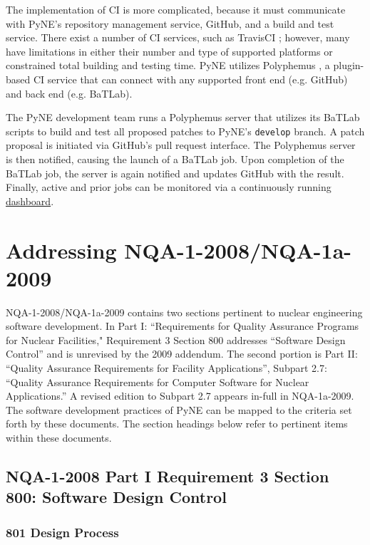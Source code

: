 \documentclass{anstrans}
\begin{document}
The implementation of CI is more complicated, because it
must communicate with PyNE's repository management service, GitHub, and a build
and test service. There exist a number of CI services, such as TravisCI
\cite{travis_2014}; however, many have limitations in either their number and
type of supported platforms or constrained total building and testing time. PyNE
utilizes Polyphemus \cite{polyphemus_2014}, a plugin-based CI service that can
connect with any supported front end (e.g. GitHub) and back end (e.g. BaTLab).

The PyNE development team runs a Polyphemus server that utilizes its BaTLab
scripts to build and test all proposed patches to PyNE's \texttt{develop}
branch. A patch proposal is initiated via GitHub's pull request
interface. The Polyphemus server is then notified, causing the launch of a
BaTLab job. Upon completion of the BaTLab job, the server is again notified and
updates GitHub with the result. Finally, active and prior jobs can be monitored
via a continuously running \href{http://gorgus.pyne.io/dashboard}{dashboard}.


\section{Addressing NQA-1-2008/NQA-1a-2009}

NQA-1-2008/NQA-1a-2009 contains two sections pertinent to nuclear engineering
software development. In Part I: ``Requirements for Quality Assurance Programs
for Nuclear Facilities," Requirement 3 Section 800 addresses ``Software Design
Control'' and is unrevised by the 2009 addendum. The second portion is Part II:
``Quality Assurance Requirements for Facility Applications'', Subpart 2.7:
``Quality Assurance Requirements for Computer Software for Nuclear
Applications.'' A revised edition to Subpart 2.7 appears in-full in NQA-1a-2009.
The software development practices of PyNE can be mapped to the criteria set
forth by these documents. The section headings below refer to pertinent items
within these documents.

\subsection{NQA-1-2008 Part I Requirement 3 Section 800: Software Design Control}

\subsubsection{801 Design Process}
\end{document}
